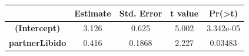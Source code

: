 \documentclass[]{article}
\begin{document}
\begin{longtable}[]{@{}ccccc@{}}
\toprule
\begin{minipage}[b]{0.24\columnwidth}\centering\strut
~\strut
\end{minipage} & \begin{minipage}[b]{0.13\columnwidth}\centering\strut
Estimate\strut
\end{minipage} & \begin{minipage}[b]{0.16\columnwidth}\centering\strut
Std. Error\strut
\end{minipage} & \begin{minipage}[b]{0.12\columnwidth}\centering\strut
t value\strut
\end{minipage} & \begin{minipage}[b]{0.13\columnwidth}\centering\strut
Pr(\textgreater{}\textbar{}t\textbar{})\strut
\end{minipage}\tabularnewline
\midrule
\endhead
\begin{minipage}[t]{0.24\columnwidth}\centering\strut
\textbf{(Intercept)}\strut
\end{minipage} & \begin{minipage}[t]{0.13\columnwidth}\centering\strut
3.126\strut
\end{minipage} & \begin{minipage}[t]{0.16\columnwidth}\centering\strut
0.625\strut
\end{minipage} & \begin{minipage}[t]{0.12\columnwidth}\centering\strut
5.002\strut
\end{minipage} & \begin{minipage}[t]{0.13\columnwidth}\centering\strut
3.342e-05\strut
\end{minipage}\tabularnewline
\begin{minipage}[t]{0.24\columnwidth}\centering\strut
\textbf{partnerLibido}\strut
\end{minipage} & \begin{minipage}[t]{0.13\columnwidth}\centering\strut
0.416\strut
\end{minipage} & \begin{minipage}[t]{0.16\columnwidth}\centering\strut
0.1868\strut
\end{minipage} & \begin{minipage}[t]{0.12\columnwidth}\centering\strut
2.227\strut
\end{minipage} & \begin{minipage}[t]{0.13\columnwidth}\centering\strut
0.03483\strut
\end{minipage}\tabularnewline

\end{longtable}
\end{document}
